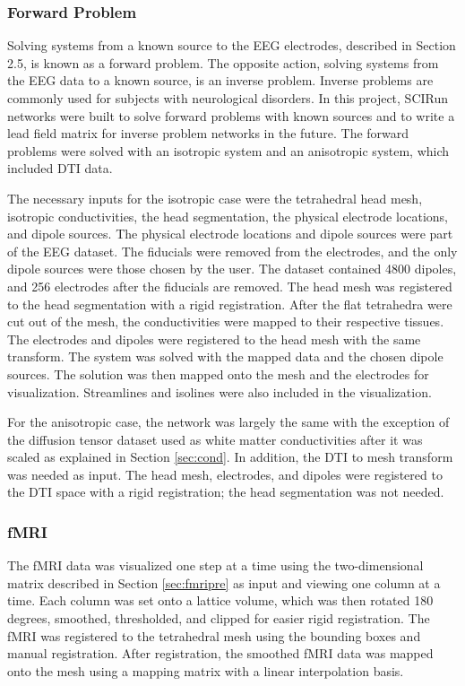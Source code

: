 \subsubsection{Forward Problem}

Solving systems from a known source to the EEG electrodes, described in Section 2.5, is known as a forward problem. The opposite action, solving systems from the EEG data to a known source, is an inverse problem. Inverse problems are commonly used for subjects with neurological disorders. In this project, SCIRun networks were built to solve forward problems with known sources and to write a lead field matrix for inverse problem networks in the future. The forward problems were solved with an isotropic system and an anisotropic system, which included DTI data. 

The necessary inputs for the isotropic case were the tetrahedral head mesh, isotropic conductivities, the head segmentation, the physical electrode locations, and dipole sources. The physical electrode locations and dipole sources were part of the EEG dataset. The fiducials were removed from the electrodes, and the only dipole sources were those chosen by the user. The dataset contained 4800 dipoles, and 256 electrodes after the fiducials are removed. The head mesh was registered to the head segmentation with a rigid registration. After the flat tetrahedra were cut out of the mesh, the conductivities were mapped to their respective tissues. The electrodes and dipoles were registered to the head mesh with the same transform. The system was solved with the mapped data and the chosen dipole sources. The solution was then mapped onto the mesh and the electrodes for visualization. Streamlines and isolines were also included in the visualization.

For the anisotropic case, the network was largely the same with the exception of the diffusion tensor dataset used as white matter conductivities after it was scaled as explained in Section \ref{sec:cond}. In addition, the DTI to mesh transform was needed as input. The head mesh, electrodes, and dipoles were registered to the DTI space with a rigid registration; the head segmentation was not needed.

\subsubsection{fMRI}

The fMRI data was visualized one step at a time using the two-dimensional matrix described in Section \ref{sec:fmripre} as input and viewing one column at a time. Each column was set onto a lattice volume, which was then rotated 180 degrees, smoothed, thresholded, and clipped for easier rigid registration. The fMRI was registered to the tetrahedral mesh using the bounding boxes and manual registration. After registration, the smoothed fMRI data was mapped onto the mesh using a mapping matrix with a linear interpolation basis. 

